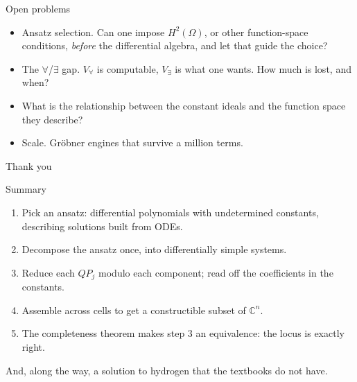 \documentclass[10pt,aspectratio=169]{beamer}
\newcommand{\C}{\mathbb{C}}
\begin{document}
\begin{frame}{Open problems}
\begin{itemize}
  \item \alert{Ansatz selection.} Can one impose $H^{2}(\Omega)$, or other
        function-space conditions, \emph{before} the differential algebra, and let
        that guide the choice?
  \item \alert{The $\forall$/$\exists$ gap.} $V_{\forall}$ is computable,
        $V_{\exists}$ is what one wants. How much is lost, and when?
  \item \alert{What is the relationship} between the constant ideals and the
        function space they describe?
  \item \alert{Scale.} Gr\"obner engines that survive a million terms.
\end{itemize}
\end{frame}

\begin{frame}[standout]
  Thank you
\end{frame}

\appendix

\begin{frame}{Summary}
\begin{enumerate}
  \item Pick an \alert{ansatz}: differential polynomials with undetermined
        constants, describing solutions built from ODEs.
  \item \alert{Decompose} the ansatz once, into differentially simple systems.
  \item \alert{Reduce} each $Q P_{j}$ modulo each component; read off the
        coefficients in the constants.
  \item \alert{Assemble} across cells to get a constructible subset of $\C^{n}$.
  \item The completeness theorem makes step 3 an \alert{equivalence}: the locus is
        exactly right.
\end{enumerate}

\bigskip
And, along the way, a solution to hydrogen that the textbooks do not have.
\end{frame}
\end{document}
